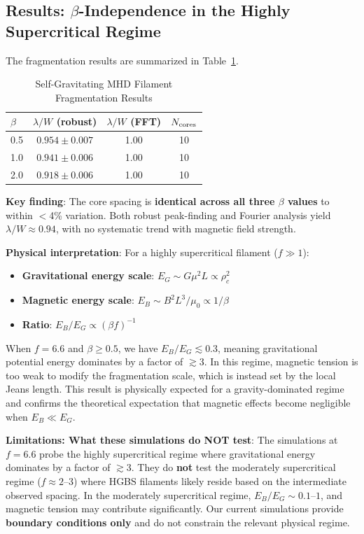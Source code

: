 \documentclass[11pt,a4paper]{article}
\begin{document}
\subsection{Results: $\beta$-Independence in the Highly Supercritical Regime}

The fragmentation results are summarized in Table~\ref{tab:mhd_sg}.

\begin{table}[H]
\centering
\caption{Self-Gravitating MHD Filament Fragmentation Results}
\label{tab:mhd_sg}
\begin{tabular}{lccc}
\toprule
$\beta$ & $\lambda/W$ (robust) & $\lambda/W$ (FFT) & $N_{\rm cores}$ \\
\midrule
0.5 & $0.954 \pm 0.007$ & 1.00 & 10 \\
1.0 & $0.941 \pm 0.006$ & 1.00 & 10 \\
2.0 & $0.918 \pm 0.006$ & 1.00 & 10 \\
\bottomrule
\end{tabular}
\end{table}

\textbf{Key finding}: The core spacing is \textbf{identical across all three $\beta$ values} to within $<$4\% variation. Both robust peak-finding and Fourier analysis yield $\lambda/W \approx 0.94$, with no systematic trend with magnetic field strength.

\textbf{Physical interpretation}: For a highly supercritical filament ($f \gg 1$):
\begin{itemize}
    \item \textbf{Gravitational energy scale}: $E_G \sim G \mu^2 L \propto \rho_c^2$
    \item \textbf{Magnetic energy scale}: $E_B \sim B^2 L^3 / \mu_0 \propto 1/\beta$
    \item \textbf{Ratio}: $E_B / E_G \propto (\beta f)^{-1}$
\end{itemize}
When $f = 6.6$ and $\beta \geq 0.5$, we have $E_B / E_G \lesssim 0.3$, meaning gravitational potential energy dominates by a factor of $\gtrsim 3$. In this regime, magnetic tension is too weak to modify the fragmentation scale, which is instead set by the local Jeans length. This result is physically expected for a gravity-dominated regime and confirms the theoretical expectation that magnetic effects become negligible when $E_B \ll E_G$.

\textbf{Limitations: What these simulations do NOT test}: The simulations at $f = 6.6$ probe the highly supercritical regime where gravitational energy dominates by a factor of $\gtrsim 3$. They do \textbf{not} test the moderately supercritical regime ($f \approx 2$--$3$) where HGBS filaments likely reside based on the intermediate observed spacing. In the moderately supercritical regime, $E_B / E_G \sim 0.1$--$1$, and magnetic tension may contribute significantly. Our current simulations provide \textbf{boundary conditions only} and do not constrain the relevant physical regime.
\end{document}
